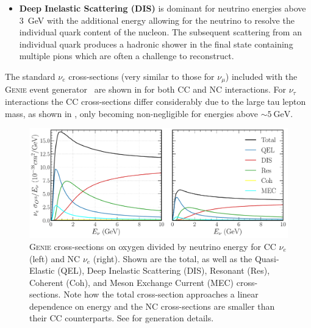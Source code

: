 \begin{itemize}
    \item \textbf{Deep Inelastic Scattering (DIS)} is dominant for neutrino energies above
          \SI{3}{\GeV} with the additional energy allowing for the neutrino to resolve the
          individual quark content of the nucleon. The subsequent scattering from an individual
          quark produces a hadronic shower in the final state containing multiple pions which are
          often a challenge to reconstruct.
\end{itemize}

The standard $\nu_{e}$ cross-sections (very similar to those for $\nu_{\mu}$) included with the
\textsc{Genie} event generator~\cite{andreopoulos2009, andreopoulos2015} are shown in
 for both CC and NC interactions. For $\nu_{\tau}$ interactions the
CC cross-sections differ considerably due to the large tau lepton mass, as shown in
, only becoming non-negligible for energies above
$\sim\SI{5}{\GeV}$.

\begin{figure} %
    \includegraphics[width=\textwidth]{diagrams/3-theory/xsec_nu_e_O16.pdf}
    \caption[$\nu_{e}$ cross-sections on oxygen]
    {\textsc{Genie} cross-sections on oxygen divided by neutrino energy for CC $\nu_{e}$ (left)
        and NC $\nu_{e}$ (right). Shown are the total, as well as the Quasi-Elastic (QEL), Deep
        Inelastic Scattering (DIS), Resonant (Res), Coherent (Coh), and Meson Exchange Current
        (MEC) cross-sections. Note how the total cross-section approaches a linear dependence on
        energy and the NC cross-sections are smaller than their CC counterparts. See
         for generation details.}
    \label{fig:xsec_nu_e_O16}
\end{figure}


